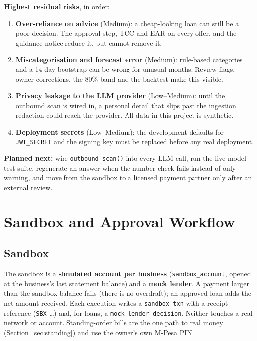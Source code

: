 \documentclass[10pt,a4paper]{article}
\newcommand{\code}[1]{\texttt{\small #1}}
\begin{document}
\textbf{Highest residual risks}, in order:
\begin{enumerate}
  \item \textbf{Over-reliance on advice} (Medium): a cheap-looking loan can still be a poor decision. The approval step, TCC and EAR on every offer, and the guidance notice reduce it, but cannot remove it.
  \item \textbf{Miscategorisation and forecast error} (Medium): rule-based categories and a 14-day bootstrap can be wrong for unusual months. Review flags, owner corrections, the 80\% band and the backtest make this visible.
  \item \textbf{Privacy leakage to the LLM provider} (Low--Medium): until the outbound scan is wired in, a personal detail that slips past the ingestion redaction could reach the provider. All data in this project is synthetic.
  \item \textbf{Deployment secrets} (Low--Medium): the development defaults for \code{JWT\_SECRET} and the signing key must be replaced before any real deployment.
\end{enumerate}
\textbf{Planned next:} wire \code{outbound\_scan()} into every LLM call, run the live-model test suite, regenerate an answer when the number check fails instead of only warning, and move from the sandbox to a licensed payment partner only after an external review.

\section{Sandbox and Approval Workflow}
\label{sec:sandbox}

\subsection{Sandbox}
The sandbox is a \textbf{simulated account per business} (\code{sandbox\_account}, opened at the business's last statement balance) and a \textbf{mock lender}. A payment larger than the sandbox balance fails (there is no overdraft); an approved loan adds the net amount received. Each execution writes a \code{sandbox\_txn} with a receipt reference (\code{SBX-\ldots}) and, for loans, a \code{mock\_lender\_decision}. Neither touches a real network or account. Standing-order bills are the one path to real money (Section~\ref{sec:standing}) and use the owner's own M-Pesa PIN.
\end{document}
